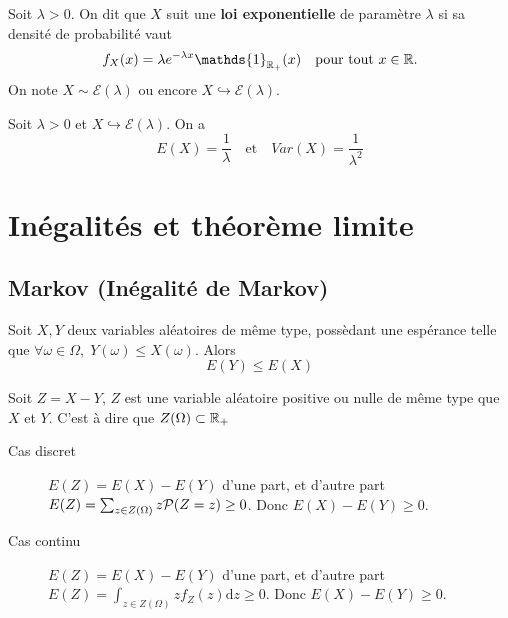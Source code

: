 \documentclass[a4paper,12pt]{article}
\begin{document}
\begin{definition}
    Soit $\lambda > 0$. On dit que $X$ suit une \textbf{loi exponentielle} de paramètre $\lambda$
    si sa densité de probabilité vaut
    $$
    f_X(x) = \lambda e^{-\lambda x} \mathds{1}_{\R_+}(x) \quad \text{pour tout } x \in \R.
    $$
    On note $X \sim \mathcal{E}(\lambda)$ ou encore $X \hookrightarrow \mathcal{E}(\lambda)$.
\end{definition}

\begin{proposition}{}{}
    Soit $\lambda > 0$ et $X \hookrightarrow \mathcal{E}(\lambda)$. On a
    $$
    E(X) = \dfrac{1}{\lambda} \quad \text{et} \quad Var(X) = \dfrac{1}{\lambda^2}
    $$
\end{proposition}

\clearpage

\section{Inégalités et théorème limite}

\subsection{Markov (Inégalité de Markov)}

\begin{lemme}{}{}
    Soit $X, Y$ deux variables aléatoires de même type, possèdant une espérance telle que
    $\forall \omega \in \Omega, \; Y(\omega) \leq X(\omega)$. Alors
    $$
    E(Y) \leq E(X)
    $$
\end{lemme}

\begin{demonstration}
    Soit $Z = X - Y$, $Z$ est une variable aléatoire positive ou nulle de même type que $X$ et $Y$.
    C'est à dire que $Z(\Omega) \subset \R_+$

    \begin{description}
        \item[Cas discret] $E(Z) = E(X) - E(Y)$ d'une part, et d'autre part $E(Z) = \sum_{z \in Z(\Omega)} z \P(Z = z) \geq 0$. Donc $E(X) - E(Y) \geq 0$.
        \item[Cas continu] $E(Z) = E(X) - E(Y)$ d'une part, et d'autre part $E(Z) = \int_{z \in Z(\Omega)} z f_Z(z) \mathrm{d}z \geq 0$. Donc $E(X) - E(Y) \geq 0$. 
    \end{description}
\end{demonstration}
\end{document}
